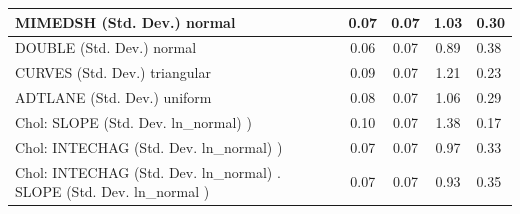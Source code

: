 \begin{table}
\begin{center}
\begin{tabular}{|l|l|c|c|c|l|}
			\hline
			MIMEDSH (Std. Dev.) normal &  & 0.07 & 0.07 & 1.03 & 0.30 \\
			\hline
			DOUBLE (Std. Dev.) normal &  & 0.06 & 0.07 & 0.89 & 0.38 \\
			\hline
			CURVES (Std. Dev.) triangular &  & 0.09 & 0.07 & 1.21 & 0.23 \\
			\hline
			ADTLANE (Std. Dev.) uniform &  & 0.08 & 0.07 & 1.06 & 0.29 \\
			\hline
			 Chol: SLOPE (Std. Dev. ln_normal) ) &  & 0.10 & 0.07 & 1.38 & 0.17 \\
			\hline
			 Chol: INTECHAG (Std. Dev. ln_normal) ) &  & 0.07 & 0.07 & 0.97 & 0.33 \\
			\hline
			 Chol: INTECHAG (Std. Dev. ln_normal) . SLOPE (Std. Dev.   ln_normal ) &  & 0.07 & 0.07 & 0.93 & 0.35 \\
			\hline
		\end{tabular}
	\end{center}
\end{table}